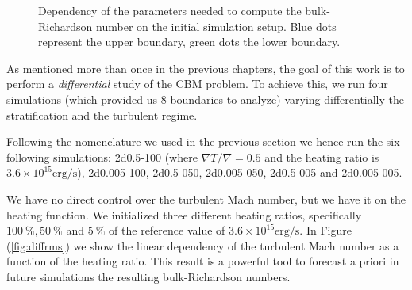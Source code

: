 \begin{figure}[t!]
  \centering
      \hfill
	\hfill
	\caption{Dependency of the parameters needed to compute the bulk-Richardson number on the initial simulation setup. Blue dots represent the upper boundary, green dots the lower boundary.}
	\label{fig:diffparam}
\end{figure}
As mentioned more than once in the previous chapters, the goal of this work is to perform a \textit{differential} study of the CBM problem. To achieve this, we run four simulations (which provided us 8 boundaries to analyze) varying differentially the stratification and the turbulent regime. 

Following the nomenclature we used in the previous section we hence run the six following simulations: 2d0.5-100 (where $\nabla T / \nabla = 0.5$ and the heating ratio is  $3.6 \times 10^{15} \mathrm{erg/s}$), 2d0.005-100, 2d0.5-050, 2d0.005-050, 2d0.5-005 and 2d0.005-005.

We have no direct control over the turbulent Mach number, but we have it on the heating function. We initialized three different heating ratios, specifically $100 \ \%, 50 \ \%$ and $5 \ \%$ of the reference value of $3.6 \times 10^{15} \mathrm{erg/s}$. In Figure (\ref{fig:diffrms}) we show the linear dependency of the turbulent Mach number as a function of the heating ratio. This result is a powerful tool to forecast a priori in future simulations the resulting bulk-Richardson numbers.

